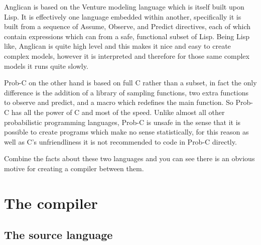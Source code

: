 \documentclass[a4paper]{article}
\begin{document}
Anglican is based on the Venture modeling language which is itself built upon Lisp. It is effectively one language embedded within another, specifically it is built from a sequence of Assume, Observe, and Predict directives, each of which contain expressions which can from a safe, functional subset of Lisp. Being Lisp like, Anglican is quite high level and this makes it nice and easy to create complex models, however it is interpreted and therefore for those same complex models it runs quite slowly.

Prob-C on the other hand is based on full C rather than a subset, in fact the only difference is the addition of a library of sampling functions, two extra functions to observe and predict, and a macro which redefines the main function. So Prob-C has all the power of C and most of the speed. Unlike almost all other probabilistic programming languages, Prob-C is unsafe in the sense that it is possible to create programs which make no sense statistically, for this reason as well as C's unfriendliness it is not recommended to code in Prob-C directly.

Combine the facts about these two languages and you can see there is an obvious motive for creating a compiler between them.




\section{The compiler}




\subsection{The source language}
\end{document}
